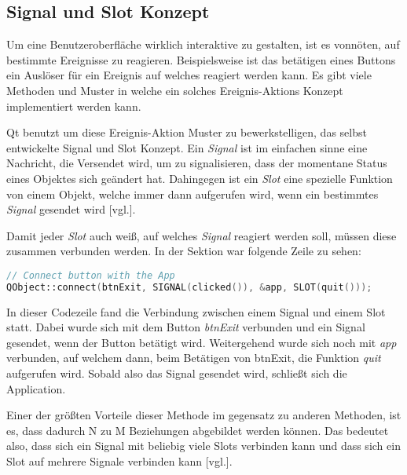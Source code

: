 \subsection{Signal und Slot Konzept}
\label{subsec:signalslot}
Um eine Benutzeroberfläche wirklich interaktive zu gestalten, ist es vonnöten, auf bestimmte
Ereignisse zu reagieren. Beispielsweise ist das betätigen eines Buttons ein Auslöser für ein
Ereignis auf welches reagiert werden kann. Es gibt viele Methoden und Muster in welche ein
solches Ereignis-Aktions Konzept implementiert werden kann.

Qt benutzt um diese Ereignis-Aktion Muster zu bewerkstelligen, das selbst entwickelte Signal und
Slot Konzept. Ein \emph{Signal} ist im einfachen sinne eine Nachricht, die Versendet wird, um zu
signalisieren, dass der momentane Status eines Objektes sich geändert hat. Dahingegen ist ein
\emph{Slot} eine spezielle Funktion von einem Objekt, welche immer dann aufgerufen wird, wenn ein
bestimmtes \emph{Signal} gesendet wird \cite{GettingStartedQt}[vgl.].

Damit jeder \emph{Slot} auch weiß, auf welches \emph{Signal} reagiert werden soll, müssen diese
zusammen verbunden werden. In der Sektion \emph{} war
folgende Zeile zu sehen:

\begin{lstlisting}[language=C++, caption=Signal und Slot beispiel, label=lst:SignalSlotBeispiel]
// Connect button with the App
QObject::connect(btnExit, SIGNAL(clicked()), &app, SLOT(quit()));

\end{lstlisting}

In dieser Codezeile fand die Verbindung zwischen einem Signal und einem Slot statt. Dabei wurde
sich mit dem Button \emph{btnExit} verbunden und ein Signal gesendet, wenn der Button betätigt
wird. Weitergehend wurde sich noch mit \emph{app} verbunden, auf welchem dann, beim Betätigen von
btnExit, die Funktion \emph{quit} aufgerufen wird. Sobald also das Signal gesendet wird, schließt
sich die Application.

Einer der größten Vorteile dieser Methode im gegensatz zu anderen Methoden, ist es, dass dadurch
N zu M Beziehungen abgebildet werden können. Das bedeutet also, dass sich ein Signal mit
beliebig viele Slots verbinden kann und dass sich ein Slot auf mehrere Signale verbinden kann
\cite{SignalSlotMechanismus}[vgl.].